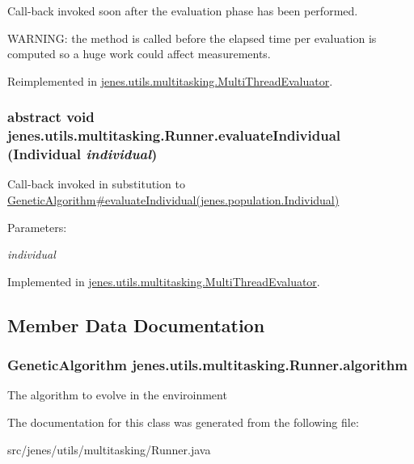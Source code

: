 Call-back invoked soon after the evaluation phase has been performed. \par
 WARNING: the method is called before the elapsed time per evaluation is computed so a huge work could affect measurements. 

Reimplemented in \hyperlink{classjenes_1_1utils_1_1multitasking_1_1_multi_thread_evaluator_3cd56b43989da43e4b3c2b79260d5f5f}{jenes.utils.multitasking.MultiThreadEvaluator}.\hypertarget{classjenes_1_1utils_1_1multitasking_1_1_runner_250c5e0ffdb86ef0bb0e78e625a449e7}{
\subsubsection[evaluateIndividual]{\setlength{\rightskip}{0pt plus 5cm}abstract void jenes.utils.multitasking.Runner.evaluateIndividual (Individual {\em individual})}}
\label{classjenes_1_1utils_1_1multitasking_1_1_runner_250c5e0ffdb86ef0bb0e78e625a449e7}


Call-back invoked in substitution to \hyperlink{}{GeneticAlgorithm\#evaluateIndividual(jenes.population.Individual)} \begin{Desc}
\item[Parameters:]
\begin{description}
\item[{\em individual}]\end{description}
\end{Desc}


Implemented in \hyperlink{classjenes_1_1utils_1_1multitasking_1_1_multi_thread_evaluator_d99c13b137f1089a9f30377548b42e25}{jenes.utils.multitasking.MultiThreadEvaluator}.

\subsection{Member Data Documentation}
\hypertarget{classjenes_1_1utils_1_1multitasking_1_1_runner_699ccf526b6116f97abc09e4ce390c89}{
\subsubsection[algorithm]{\setlength{\rightskip}{0pt plus 5cm}GeneticAlgorithm {\bf jenes.utils.multitasking.Runner.algorithm}}}
\label{classjenes_1_1utils_1_1multitasking_1_1_runner_699ccf526b6116f97abc09e4ce390c89}


The algorithm to evolve in the enviroinment 

The documentation for this class was generated from the following file:\begin{CompactItemize}
\item 
src/jenes/utils/multitasking/Runner.java\end{CompactItemize}
